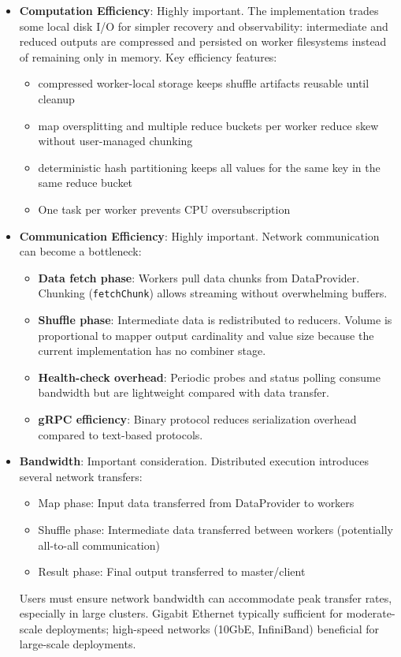 \documentclass{scrartcl}
\begin{document}
\begin{itemize}
    \item \textbf{Computation Efficiency}: Highly important. The implementation trades some local disk I/O for simpler recovery and observability: intermediate and reduced outputs are compressed and persisted on worker filesystems instead of remaining only in memory. Key efficiency features:
          \begin{itemize}
              \item compressed worker-local storage keeps shuffle artifacts reusable until cleanup
              \item map oversplitting and multiple reduce buckets per worker reduce skew without user-managed chunking
              \item deterministic hash partitioning keeps all values for the same key in the same reduce bucket
              \item One task per worker prevents CPU oversubscription
          \end{itemize}

    \item \textbf{Communication Efficiency}: Highly important. Network communication can become a bottleneck:
          \begin{itemize}
              \item \textbf{Data fetch phase}: Workers pull data chunks from DataProvider. Chunking (\texttt{fetchChunk}) allows streaming without overwhelming buffers.
              \item \textbf{Shuffle phase}: Intermediate data is redistributed to reducers. Volume is proportional to mapper output cardinality and value size because the current implementation has no combiner stage.
              \item \textbf{Health-check overhead}: Periodic probes and status polling consume bandwidth but are lightweight compared with data transfer.
              \item \textbf{gRPC efficiency}: Binary protocol reduces serialization overhead compared to text-based protocols.
          \end{itemize}

    \item \textbf{Bandwidth}: Important consideration. Distributed execution introduces several network transfers:
          \begin{itemize}
              \item Map phase: Input data transferred from DataProvider to workers
              \item Shuffle phase: Intermediate data transferred between workers (potentially all-to-all communication)
              \item Result phase: Final output transferred to master/client
          \end{itemize}
          Users must ensure network bandwidth can accommodate peak transfer rates, especially in large clusters. Gigabit Ethernet typically sufficient for moderate-scale deployments; high-speed networks (10GbE, InfiniBand) beneficial for large-scale deployments.


\end{itemize}
\end{document}
